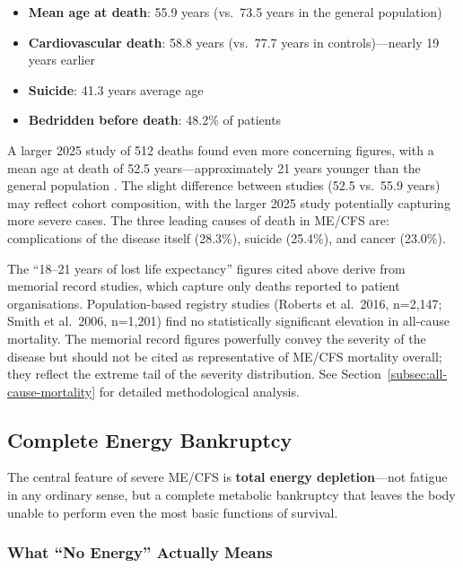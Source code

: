 \begin{itemize}
    \item \textbf{Mean age at death}: 55.9 years (vs.\ 73.5 years in the general population)
    \item \textbf{Cardiovascular death}: 58.8 years (vs.\ 77.7 years in controls)---nearly 19 years earlier
    \item \textbf{Suicide}: 41.3 years average age
    \item \textbf{Bedridden before death}: 48.2\% of patients
\end{itemize}

A larger 2025 study of 512 deaths found even more concerning figures, with a mean age at death of 52.5 years---approximately 21 years younger than the general population \cite{Sirotiak2025}. The slight difference between studies (52.5 vs.\ 55.9 years) may reflect cohort composition, with the larger 2025 study potentially capturing more severe cases. The three leading causes of death in ME/CFS are: complications of the disease itself (28.3\%), suicide (25.4\%), and cancer (23.0\%).

\begin{limitation}
The ``18--21 years of lost life expectancy'' figures cited above derive from memorial record studies, which capture only deaths reported to patient organisations. Population-based registry studies (Roberts et al.\ 2016, n=2,147; Smith et al.\ 2006, n=1,201) find no statistically significant elevation in all-cause mortality. The memorial record figures powerfully convey the severity of the disease but should not be cited as representative of ME/CFS mortality overall; they reflect the extreme tail of the severity distribution. See Section~\ref{subsec:all-cause-mortality} for detailed methodological analysis.
\end{limitation}

\subsection{Complete Energy Bankruptcy}
\label{sec:energy-depletion}

The central feature of severe ME/CFS is \textbf{total energy depletion}---not fatigue in any ordinary sense, but a complete metabolic bankruptcy that leaves the body unable to perform even the most basic functions of survival.

\subsubsection{What ``No Energy'' Actually Means}
\label{subsec:what-no-energy-means}

